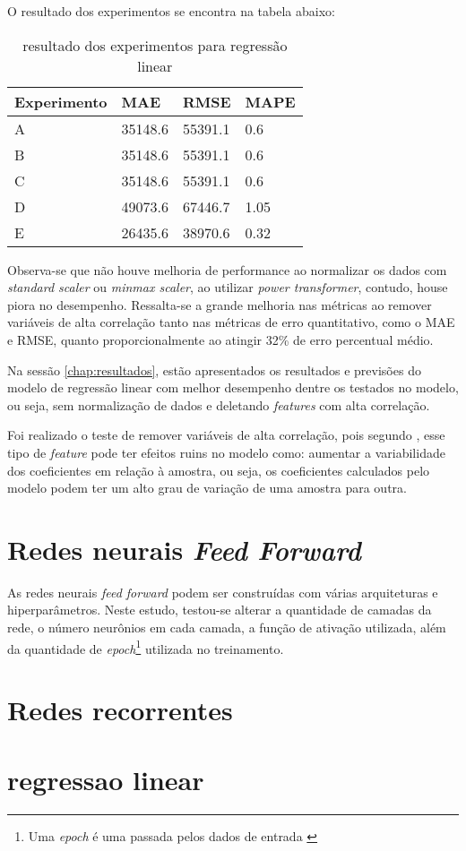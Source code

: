 O resultado dos experimentos se encontra na tabela abaixo:

\begin{table}[H]
    \begin{tabular}{llll}
        \toprule
        Experimento & MAE     & RMSE    & MAPE \\
        \midrule
        A           & 35148.6 & 55391.1 & 0.6  \\
        B           & 35148.6 & 55391.1 & 0.6  \\
        C           & 35148.6 & 55391.1 & 0.6  \\
        D           & 49073.6 & 67446.7 & 1.05 \\
        E           & 26435.6 & 38970.6 & 0.32 \\
        \bottomrule
    \end{tabular}
    \caption{resultado dos experimentos para regressão linear}
\end{table}

Observa-se que não houve melhoria de performance ao normalizar 
os dados com \textit{standard scaler} ou \textit{minmax scaler},
ao utilizar \textit{power transformer}, contudo, house piora 
no desempenho. Ressalta-se a grande melhoria nas métricas ao 
remover variáveis de alta correlação tanto nas métricas de erro 
quantitativo, como o MAE e RMSE, quanto proporcionalmente ao 
atingir 32\% de erro percentual médio.

Na sessão \ref{chap:resultados}, estão apresentados os 
resultados e previsões do modelo de regressão linear com
melhor desempenho dentre os testados no modelo, ou seja, sem 
normalização de dados e deletando \textit{features} com alta 
correlação.

Foi realizado o teste de remover variáveis de alta correlação, 
pois segundo \cite{corr_reg_lin}, esse tipo de \textit{feature}
pode ter efeitos ruins no modelo como: aumentar a variabilidade
dos coeficientes em relação à amostra, ou seja, os coeficientes 
calculados pelo modelo podem ter um alto grau de variação de uma 
amostra para outra.

\section{Redes neurais \textit{Feed Forward}}

As redes neurais \textit{feed forward} podem ser construídas
com várias arquiteturas e hiperparâmetros. Neste estudo, testou-se
alterar a quantidade de camadas da rede, o número neurônios em 
cada camada, a função de ativação utilizada, além da quantidade
de \textit{epoch}\footnote{Uma \textit{epoch} é uma passada 
pelos dados de entrada \cite{dl-oreilly}} utilizada no treinamento.



\section{Redes recorrentes}
\section{regressao linear}